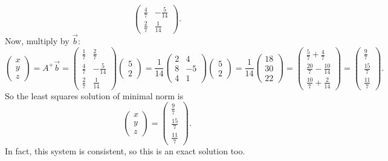 \documentclass[10pt]{extarticle}
\begin{document}
\begin{enumerate}[label=(\alph*)]
\[\begin{pmatrix}
\frac{4}{7} & -\frac{5}{14}\\[0.4em]
\frac{2}{7} & \frac{1}{14}
\end{pmatrix}.
\]
Now, multiply by $\vec{b}$:
\[
\begin{pmatrix}
x\\y\\z
\end{pmatrix}
=
A^+\vec{b}
=
\begin{pmatrix}
\frac{1}{7} & \frac{2}{7}\\[0.4em]
\frac{4}{7} & -\frac{5}{14}\\[0.4em]
\frac{2}{7} & \frac{1}{14}
\end{pmatrix}
\begin{pmatrix}
5\\2
\end{pmatrix}
=
\frac{1}{14}
\begin{pmatrix}
2 & 4\\
8 & -5\\
4 & 1
\end{pmatrix}
\begin{pmatrix}
5\\2
\end{pmatrix}
=
\frac{1}{14}
\begin{pmatrix}
18\\[0.4em]
30\\[0.4em]
22
\end{pmatrix}
=
\begin{pmatrix}
\frac{5}{7}+\frac{4}{7}\\[0.4em]
\frac{20}{7}-\frac{10}{14}\\[0.4em]
\frac{10}{7}+\frac{2}{14}
\end{pmatrix}
=
\begin{pmatrix}
\frac{9}{7}\\[0.4em]
\frac{15}{7}\\[0.4em]
\frac{11}{7}
\end{pmatrix}.
\]
So the least squares solution of minimal norm is
\[
\boxed{\begin{pmatrix}x\\y\\z\end{pmatrix}
=
\begin{pmatrix}
\frac{9}{7}\\[0.4em]
\frac{15}{7}\\[0.4em]
\frac{11}{7}
\end{pmatrix}.}
\]
In fact, this system is consistent, so this is an exact solution too.


\end{enumerate}
\end{document}
